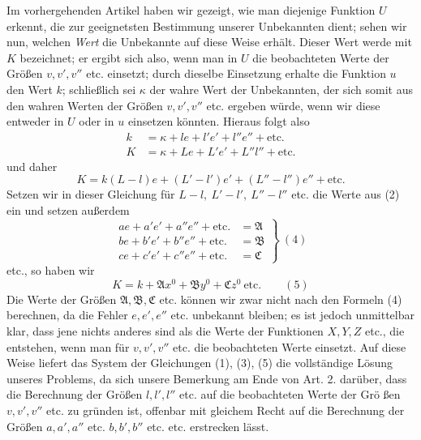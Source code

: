 Im vorhergehenden Artikel haben wir gezeigt, wie man diejenige Funktion \(U\) erkennt, die zur geeignetsten Bestimmung unserer Unbekannten dient; sehen wir nun, welchen \textit{Wert} die Unbekannte auf diese Weise erhält. Dieser Wert werde mit \(K\) bezeichnet; er ergibt sich also, wenn man in \(U\) die beobachteten Werte der Größen \(v,v',v''\) etc. einsetzt; durch dieselbe Einsetzung erhalte die Funktion \(u\) den Wert \(k\); schließlich sei \(\kappa\) der wahre Wert der Unbekannten, der sich somit aus den wahren Werten der Größen \(v,v',v''\) etc. ergeben würde, wenn wir diese entweder in \(U\) oder in \(u\) einsetzen könnten. Hieraus folgt also
\[
\begin{aligned}
k&=\kappa+le+l'e'+l''e''+\text{etc.}\\
K&=\kappa+Le+L'e'+L''l''+\text{etc.}
\end{aligned}
\]
und daher
\[
K=k(L-l)e+(L'-l')e'+(L''-l'')e''+\text{etc.}
\]
Setzen wir in dieser Gleichung für \(L-l,\ L'-l',\ L''-l''\) etc. die Werte aus (2) ein und setzen außerdem
\[
\left.\begin{aligned}
ae+a'e'+a''e''+\text{etc.}&=\mathfrak A\\
be+b'e'+b''e''+\text{etc.}&=\mathfrak B\\
ce+c'e'+c''e''+\text{etc.}&=\mathfrak C
\end{aligned}\right\}\ (4)
\]
etc., so haben wir
\[
K=k+\mathfrak A x^0+\mathfrak B y^0+\mathfrak C z^0\ \text{etc.}\qquad(5)
\]
Die Werte der Größen \(\mathfrak A,\mathfrak B,\mathfrak C\) etc. können wir zwar nicht nach den Formeln (4) berechnen, da die Fehler \(e,e',e''\) etc. unbekannt bleiben; es ist jedoch unmittelbar klar, dass jene nichts anderes sind als die Werte der Funktionen \(X,Y,Z\) etc., die entstehen, wenn man für \(v,v',v''\) etc. die beobachteten Werte einsetzt. Auf diese Weise liefert das System der Gleichungen (1), (3), (5) die vollständige Lösung unseres Problems, da sich unsere Bemerkung am Ende von Art. 2. darüber, dass die Berechnung der Größen \(l,l',l''\) etc. auf die beobachteten Werte der Grö%
ßen \(v,v',v''\) etc. zu gründen ist, offenbar mit gleichem Recht auf die Berechnung der Größen \(a,a',a''\) etc. \(b,b',b''\) etc. etc. erstrecken lässt.

\clearpage
